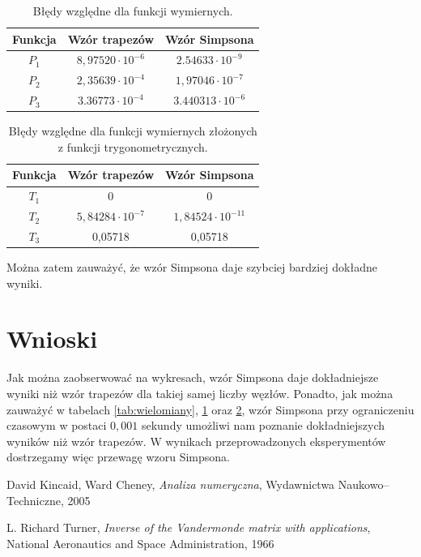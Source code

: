 \documentclass{article}
\theoremstyle{definition}
\begin{document}
\begin{table}[!h]
    \centering
    \begin{tabular}{|c|c|c|}
            \hline
             Funkcja & Wzór trapezów &  Wzór Simpsona \\
             \hline \hline
            \(P_1\) &  \(8,97520 \cdot 10^{-6} \) & \(2.54633 \cdot 10^{-9}\) \\
            \(P_2\) &  \(2,35639 \cdot 10^{-4}\) & \(1,97046 \cdot 10^{-7}\) \\
            \(P_3\) &  \(3.36773 \cdot 10^{-4}\) & \(3.440313 \cdot 10^{-6}\) \\
            \hline
    \end{tabular}
    \caption{Błędy względne dla funkcji wymiernych.}
    \label{tab:wymierne}
\end{table}

\begin{table}[!h]
    \centering
    \begin{tabular}{|c|c|c|}
            \hline
             Funkcja & Wzór trapezów &  Wzór Simpsona \\
             \hline \hline
            \(T_1\) &  0 & 0 \\
            \(T_2\) &  \(5,84284 \cdot 10^{-7}\) & \(1,84524 \cdot 10^{-11}\) \\
            \(T_3\) &  0,05718 & 0,05718 \\
            \hline
    \end{tabular}
    \caption{Błędy względne dla funkcji wymiernych złożonych z funkcji trygonometrycznych.}
    \label{tab:trygonometryczne}
\end{table}

\noindent Można zatem zauważyć, że wzór Simpsona daje szybciej bardziej dokładne wyniki. 



\section{Wnioski}

Jak można zaobserwować na wykresach, wzór Simpsona daje dokładniejsze wyniki niż wzór trapezów dla takiej samej liczby węzłów. Ponadto, jak można zauważyć w tabelach \ref{tab:wielomiany}, \ref{tab:wymierne} oraz \ref{tab:trygonometryczne}, wzór Simpsona przy ograniczeniu czasowym w postaci \(0,001\) sekundy umożliwi nam poznanie dokładniejszych wyników niż wzór trapezów. W wynikach przeprowadzonych eksperymentów dostrzegamy więc przewagę wzoru Simpsona. 


\begin{thebibliography}{9}
David Kincaid, Ward Cheney, \emph{Analiza numeryczna}, Wydawnictwa Naukowo--Techniczne, 2005

L. Richard Turner, \emph{Inverse of the Vandermonde matrix with applications}, National Aeronautics and Space Administration, 1966 
\end{thebibliography}
\end{document}
